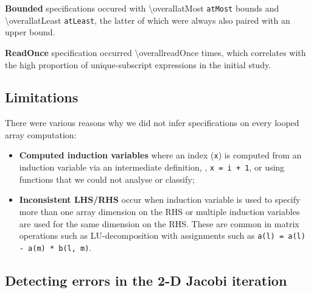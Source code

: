 \textbf{Bounded} specifications occured with \num{\overallatMost}
\texttt{atMost} bounds and \num{\overallatLeast} \texttt{atLeast}, the latter of which were
always also paired with an upper bound.

\textbf{ReadOnce} specification occurred \num{\overallreadOnce} times, which
correlates with the high proportion of unique-subscript expressions
in the initial study.


\subsection{Limitations}

\noindent
There were various reasons why we did not infer
specifications on every looped array computation:
\begin{itemize}
\item \textbf{Computed induction variables} where an
index (\texttt{x}) is computed from an
induction variable via an intermediate definition, \eg{}, 
\texttt{x = i + 1}, or using functions that
we could not analyse or classify;

\item \textbf{Inconsistent LHS/RHS} occur when
induction variable is used to specify more than one array dimension
on the RHS or multiple induction variables are used for the same
dimension on the RHS. These are common in matrix operations such as
LU-decomposition with assignments such as
\texttt{a(l) = a(l) - a(m) * b(l, m)}.
\end{itemize}

\subsection{Detecting errors in the 2-D Jacobi iteration}
\label{sec:jacobi}

